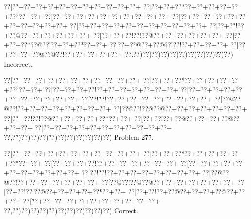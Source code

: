 \documentclass[a5paper]{article}
\begin{document}
\begin{center}
{\goo
\0??[\0??+\0??+\0??+\0??+\0??+\0??+\0??+\0??+\0??+\0??+\0??+
\0??[\0??+\0??+\0??*\0??+\0??+\0??+\0??+\0??+\0??*\0??+\0??+
\0??[\0??+\0??+\0??+\0??+\0??+\0??+\0??+\0??+\0??+\0??+
\0??[\0??+\0??+\0??+\0??+\0??+\0??+\0??+\0??+\0??+\0??+\0??+
\0??[\0??+\0??+\0??+\0??+\0??+\0??+\0??+\0??+\0??+\0??+\0??+
\0??[\0??+\0??!\0??+\0??@\0??+\0??+\0??+\0??+\0??+\0??+
\0??[\0??+\0??+\0??!\0??!\0??@\0??+\0??+\0??+\0??+\0??+\0??+
\0??[\0??+\0??+\0??*\0??@\0??!\0??+\0??+\0??*\0??+\0??+
\0??[\0??+\0??@\0??+\0??@\0??!\0??!\0??+\0??+\0??+\0??+
\0??[\0??+\0??+\0??+\0??@\0??@\0??!\0??+\0??+\0??+\0??+\0??+
\0??,\0??)\0??)\0??)\0??)\0??)\0??)\0??)\0??)\0??)\0??)\0??)
}
Incorrect. 

\end{center}
\newpage
\begin{center}
{\goo
\0??[\0??+\0??+\0??+\0??+\0??+\0??+\0??+\0??+\0??+\0??+\0??+
\0??[\0??+\0??+\0??*\0??+\0??+\0??+\0??+\0??+\0??*\0??+\0??+
\0??[\0??+\0??+\0??+\0??!\0??+\0??+\0??+\0??+\0??+\0??+\0??+
\0??[\0??+\0??+\0??+\0??+\0??+\0??+\0??+\0??+\0??+\0??+\0??+
\0??[\0??!\0??!\0??+\0??+\0??+\0??+\0??+\0??+\0??+\0??+\0??+
\0??[\0??@\0??@\0??!\0??+\0??+\0??+\0??+\0??+\0??+\0??+\0??+
\0??[\0??@\0??!\0??@\0??@\0??+\0??+\0??+\0??+\0??+\0??+\0??+
\0??[\0??+\0??!\0??!\0??@\0??+\0??+\0??+\0??+\0??*\0??+\0??+
\0??[\0??+\0??!\0??+\0??@\0??+\0??+\0??+\0??@\0??+\0??+\0??+
\0??[\0??+\0??+\0??+\0??+\0??+\0??+\0??+\0??+\0??+\0??+\0??+
\0??,\0??)\0??)\0??)\0??)\0??)\0??)\0??)\0??)\0??)\0??)\0??)
}
Problem 277.

\end{center}
\begin{center}
{\goo
\0??[\0??+\0??+\0??+\0??+\0??+\0??+\0??+\0??+\0??+\0??+\0??+
\0??[\0??+\0??+\0??*\0??+\0??+\0??+\0??+\0??+\0??*\0??+\0??+
\0??[\0??+\0??+\0??+\0??!\0??+\0??+\0??+\0??+\0??+\0??+\0??+
\0??[\0??+\0??+\0??+\0??+\0??+\0??+\0??+\0??+\0??+\0??+\0??+
\0??[\0??!\0??!\0??+\0??+\0??+\0??+\0??+\0??+\0??+\0??+
\0??[\0??@\0??@\0??!\0??+\0??+\0??+\0??+\0??+\0??+\0??+
\0??[\0??@\0??!\0??@\0??@\0??+\0??+\0??+\0??+\0??+\0??+\0??+
\0??[\0??+\0??!\0??!\0??@\0??+\0??+\0??+\0??+\0??*\0??+\0??+
\0??[\0??+\0??!\0??+\0??@\0??+\0??+\0??+\0??@\0??+\0??+\0??+
\0??[\0??+\0??+\0??+\0??+\0??+\0??+\0??+\0??+\0??+\0??+\0??+
\0??,\0??)\0??)\0??)\0??)\0??)\0??)\0??)\0??)\0??)\0??)\0??)
}
Correct. 

\end{center}
\end{document}
